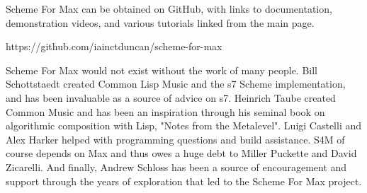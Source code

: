 \documentclass[acmsmall]{acmart}
\begin{document}
Scheme For Max can be obtained on GitHub, with links to documentation,
demonstration videos, and various tutorials linked from the main page.

https://github.com/iainctduncan/scheme-for-max

\begin{acks}
Scheme For Max would not exist without the work of many people. 
Bill Schottstaedt created Common Lisp Music and the s7 Scheme implementation,
and has been invaluable as a source of advice on s7. Heinrich Taube
created Common Music and has been an inspiration through his seminal book
on algorithmic composition with Lisp, "Notes from the Metalevel".
Luigi Castelli and Alex Harker helped with programming questions
and build assistance. 
S4M of course depends on Max and thus owes a huge debt to 
Miller Puckette and David Zicarelli. And finally, Andrew Schloss has
been a source of encouragement and support through the years of 
exploration that led to the Scheme For Max project.

\end{acks}




\end{document}
